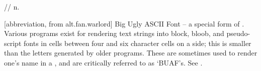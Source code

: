  // n.

[abbreviation, from alt.fan.warlord] Big Ugly ASCII Font -- a special form of
. Various programs exist for rendering text strings into
block, bloob, and pseudo-script fonts in cells between four and six character
cells on a side; this is smaller than the letters generated by older
 programs. These are sometimes used to render one's name in
a , and are critically referred to as `BUAF's. See
.

